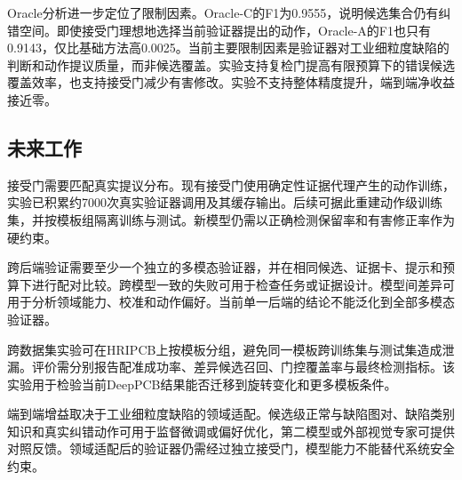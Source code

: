 Oracle分析进一步定位了限制因素。Oracle-C的F1为0.9555，说明候选集合仍有纠错空间。即使接受门理想地选择当前验证器提出的动作，Oracle-A的F1也只有0.9143，仅比基础方法高0.0025。当前主要限制因素是验证器对工业细粒度缺陷的判断和动作提议质量，而非候选覆盖。实验支持复检门提高有限预算下的错误候选覆盖效率，也支持接受门减少有害修改。实验不支持整体精度提升，端到端净收益接近零。

\subsection{未来工作}

接受门需要匹配真实提议分布。现有接受门使用确定性证据代理产生的动作训练，实验已积累约7000次真实验证器调用及其缓存输出。后续可据此重建动作级训练集，并按模板组隔离训练与测试。新模型仍需以正确检测保留率和有害修正率作为硬约束。

跨后端验证需要至少一个独立的多模态验证器，并在相同候选、证据卡、提示和预算下进行配对比较。跨模型一致的失败可用于检查任务或证据设计。模型间差异可用于分析领域能力、校准和动作偏好。当前单一后端的结论不能泛化到全部多模态验证器。

跨数据集实验可在HRIPCB上按模板分组，避免同一模板跨训练集与测试集造成泄漏。评价需分别报告配准成功率、差异候选召回、门控覆盖率与最终检测指标。该实验用于检验当前DeepPCB结果能否迁移到旋转变化和更多模板条件。

端到端增益取决于工业细粒度缺陷的领域适配。候选级正常与缺陷图对、缺陷类别知识和真实纠错动作可用于监督微调或偏好优化，第二模型或外部视觉专家可提供对照反馈。领域适配后的验证器仍需经过独立接受门，模型能力不能替代系统安全约束。

